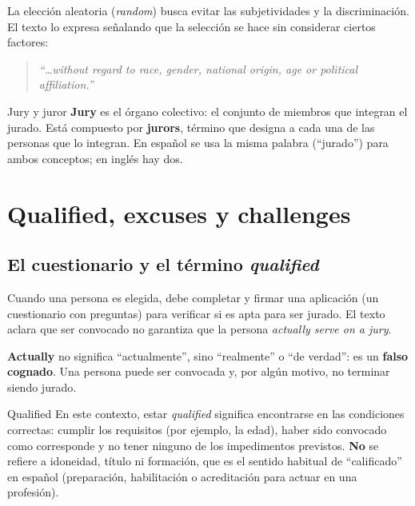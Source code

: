 \documentclass[12pt,oneside]{book}
\begin{document}
La elección aleatoria (\textit{random}) busca evitar las subjetividades y la discriminación. El texto lo expresa señalando que la selección se hace sin considerar ciertos factores:

\begin{quote}
\textit{``\ldots without regard to race, gender, national origin, age or political affiliation.''}
\end{quote}

\begin{definition}{Jury y juror}
\textbf{Jury} es el órgano colectivo: el conjunto de miembros que integran el jurado. Está compuesto por \textbf{jurors}, término que designa a cada una de las personas que lo integran. En español se usa la misma palabra (``jurado'') para ambos conceptos; en inglés hay dos.
\end{definition}

\section{Qualified, excuses y challenges}

\subsection{El cuestionario y el término \textit{qualified}}

Cuando una persona es elegida, debe completar y firmar una aplicación (un cuestionario con preguntas) para verificar si es apta para ser jurado. El texto aclara que ser convocado no garantiza que la persona \textit{actually serve on a jury}.

\begin{important}
\textbf{Actually} no significa ``actualmente'', sino ``realmente'' o ``de verdad'': es un \textbf{falso cognado}. Una persona puede ser convocada y, por algún motivo, no terminar siendo jurado.
\end{important}

\begin{definition}{Qualified}
En este contexto, estar \textit{qualified} significa encontrarse en las condiciones correctas: cumplir los requisitos (por ejemplo, la edad), haber sido convocado como corresponde y no tener ninguno de los impedimentos previstos. \textbf{No} se refiere a idoneidad, título ni formación, que es el sentido habitual de ``calificado'' en español (preparación, habilitación o acreditación para actuar en una profesión).
\end{definition}
\end{document}
